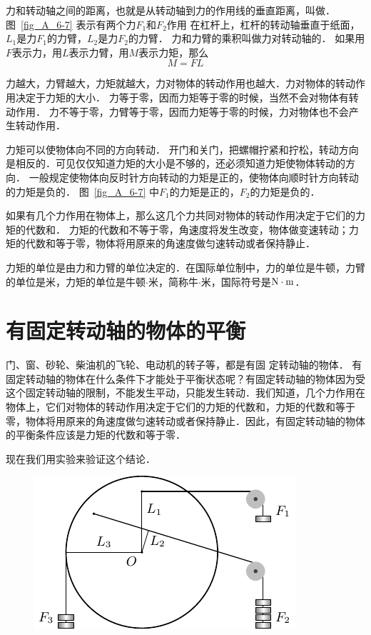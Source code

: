 力和转动轴之间的距离，也就是从转动轴到力的作用线的垂直距离，叫做．
图~\ref{fig_A_6-7} 表示有两个力$F_1$和$F_2$作用
在杠杆上，杠杆的转动轴垂直于纸面，$L_1$是力$F_1$的力臂，$L_2$是力$F_2$的力臂．
力和力臂的乘积叫做力对转动轴的．
如果用$F$表示力，用$L$表示力臂，用$M$表示力矩，那么
\[M=FL\]


力越大，力臂越大，力矩就越大，力对物体的转动作用也越大．力对物体的转动作用决定于力矩的大小．
力等于零，因而力矩等于零的时候，当然不会对物体有转动作用．
力不等于零，力臂等于零，因而力矩等于零的时候，力对物体也不会产生转动作用．

力矩可以使物体向不同的方向转动．
开门和关门，把螺帽拧紧和拧松，转动方向是相反的．可见仅仅知道力矩的大小是不够的，还必须知道力矩使物体转动的方向．
一般规定使物体向反时针方向转动的力矩是正的，使物体向顺时针方向转动的力矩是负的．
图~\ref{fig_A_6-7} 中$F_1$的力矩是正的，$F_2$的力矩是负的．

如果有几个力作用在物体上，那么这几个力共同对物体的转动作用决定于它们的力矩的代数和．
力矩的代数和不等于零，角速度将发生改变，物体做变速转动；力矩的代数和等于零，物体将用原来的角速度做匀速转动或者保持静止．

力矩的单位是由力和力臂的单位决定的．在国际单位制中，力的单位是牛顿，力臂的单位是米，力矩的单位是牛顿$\cdot$米，简称牛$\cdot$米，国际符号是$\text{N}\cdot\text{m}$．

\section{有固定转动轴的物体的平衡}
门、窗、砂轮、柴油机的飞轮、电动机的转子等，都是有固
定转动轴的物体．
有固定转动轴的物体在什么条件下才能处于平衡状态呢？有固定转动轴的物体因为受这个固定转动轴的限制，不能发生平动，只能发生转动．我们知道，几个力作用在物体上，它们对物体的转动作用决定于它们的力矩的代数和，力矩的代数和等于零，物体将用原来的角速度做匀速转动或者保持静止．因此，有固定转动轴的物体的平衡条件应该是力矩的代数和等于零．

现在我们用实验来验证这个结论．
\begin{figure}[htbp]
    \centering
    \includegraphics{fig/A/6-8.pdf}
    \caption{}\label{fig_A_6-8}
\end{figure}

